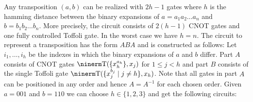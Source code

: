 






\medskip{}\enspace Any transposition $(a,b)$ can be
realized with $2h-1$ gates where $h$ is the hamming distance between the binary
expansions of $a=a_1a_2\dots a_n$ and $b=b_1b_2\dots b_n$.  More precisely, the
circuit consists of $2(h-1)$ CNOT gates and one fully controlled Toffoli gate.
In the worst case we have $h=n$.  The circuit to represent a transposition has
the form $ABA$ and is constructed as follows: Let $i_1,\dots,i_h$ be the indexes
in which the binary expansions of $a$ and $b$ differ.  Part $A$ consists of CNOT
gates ${\rm T}(\{x_h^{a_h}\}, x_j)$ for $1\le j< h$ and part $B$ consists of the
single Toffoli gate ${\rm T}(\{x_j^{b_j}\mid j\neq h\}, x_h)$.  Note that all
gates in part $A$ can be positioned in any order and hence $A=A^{-1}$ for each
chosen order.  Given $a=001$ and $b=110$ we can choose $h \in \{1,2,3\}$ and get
the following circuits:

